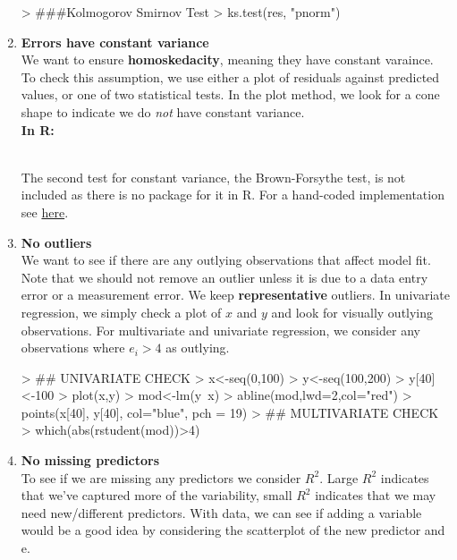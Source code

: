 \documentclass{article}
\begin{document}
\begin{enumerate}
\begin{Schunk}
\begin{Sinput}
> ###Kolmogorov Smirnov Test
> ks.test(res, "pnorm")
\end{Sinput}
\end{Schunk}
    \item \textbf{Errors have constant variance}
    \\ We want to ensure \textbf{homoskedacity}, meaning they have constant varaince. To check this assumption, we use either a plot of residuals against predicted values, or one of two statistical tests. In the plot method, we look for a cone shape to indicate we do \emph{not} have constant variance.
    \\ \textbf{In R:}
\begin{Schunk}
\end{Schunk}
  \\ The second test for constant variance, the Brown-Forsythe test, is not included as there is no package for it in R. For a hand-coded implementation see \href{https://moodle.colgate.edu/pluginfile.php/375154/mod_resource/content/0/4\%20--\%20Check\%20if\%20Errors\%20are\%20homoskedastic\%20\%28Brown-Forsythe\%29\%20--\%20age\%20vs\%20SBP.R}{here}.
    \item \textbf{No outliers}
    \\ We want to see if there are any outlying observations that affect model fit. Note that we should not remove an outlier unless it is due to a data entry error or a measurement error. We keep \textbf{representative} outliers. In univariate regression, we simply check a plot of $x$ and $y$ and look for visually outlying observations. For multivariate and univariate regression, we consider any observations where $e_i>4$ as outlying.
\begin{Schunk}
\begin{Sinput}
> ## UNIVARIATE CHECK
> x<-seq(0,100)
> y<-seq(100,200)
> y[40]<-100
> plot(x,y)
> mod<-lm(y~x)
> abline(mod,lwd=2,col="red")
> points(x[40], y[40], col="blue", pch = 19)
> ## MULTIVARIATE CHECK
> which(abs(rstudent(mod))>4)
\end{Sinput}
\end{Schunk}
    \item \textbf{No missing predictors}
    \\ To see if we are missing any predictors we consider $R^2$. Large $R^2$ indicates that we've captured more of the variability, small $R^2$ indicates that we may need new/different predictors. With data, we can see if adding a variable would be a good idea by considering the scatterplot of the new predictor and e.

\end{enumerate}
\end{document}
